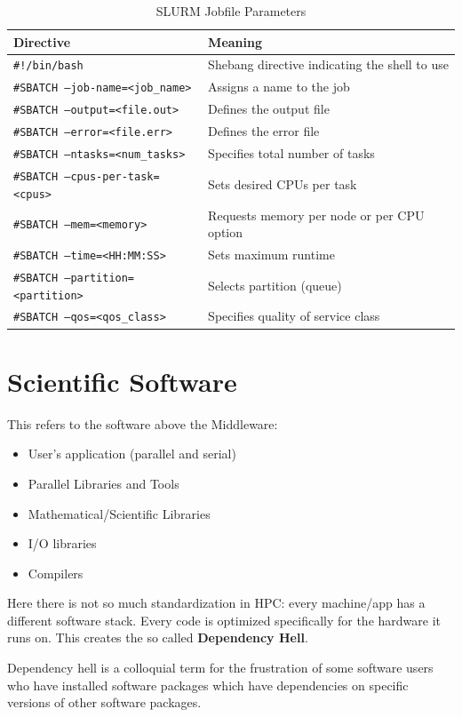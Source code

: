 \begin{table}[H]
\centering
\caption{SLURM Jobfile Parameters}
\label{tab:slurm_jobfile}
\begin{tabular}{ll}
\hline
\textbf{Directive} & \textbf{Meaning} \\ \hline
\texttt{\#!/bin/bash} & Shebang directive indicating the shell to use \\
\texttt{\#SBATCH --job-name=<job\_name>} & Assigns a name to the job \\
\texttt{\#SBATCH --output=<file.out>} & Defines the output file \\
\texttt{\#SBATCH --error=<file.err>} & Defines the error file \\
\texttt{\#SBATCH --ntasks=<num\_tasks>} & Specifies total number of tasks \\
\texttt{\#SBATCH --cpus-per-task=<cpus>} & Sets desired CPUs per task \\
\texttt{\#SBATCH --mem=<memory>} & Requests memory per node or per CPU option \\
\texttt{\#SBATCH --time=<HH:MM:SS>} & Sets maximum runtime \\
\texttt{\#SBATCH --partition=<partition>} & Selects partition (queue) \\
\texttt{\#SBATCH --qos=<qos\_class>} & Specifies quality of service class \\
\hline
\end{tabular}
\end{table}


\newpage
\section{Scientific Software}

This refers to the software above the Middleware:
\begin{itemize}
    \item User's application (parallel and serial)
    \item Parallel Libraries and Tools
    \item Mathematical/Scientific Libraries
    \item I/O libraries 
    \item Compilers
\end{itemize}

Here there is not so much standardization in HPC: every machine/app has a different software stack. Every code is optimized specifically for the hardware it runs on. This creates the so called \textbf{Dependency Hell}.
\begin{definitionblock}
    Dependency hell is a colloquial term for the frustration of some software users who have installed software packages which have dependencies on specific versions of other software packages.
\end{definitionblock}

